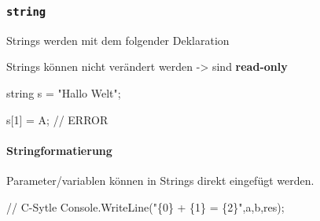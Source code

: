 \documentclass[
  9pt,
  a4paperpaper,
  DIV=11]{scrartcl}
\let\oldparagraph\paragraph
\renewcommand{\paragraph}[1]{\oldparagraph{#1}\mbox{}}
\newenvironment{Shaded}{}{}
\newcommand{\CharTok}[1]{\textcolor[rgb]{0.01,0.18,0.38}{#1}}
\newcommand{\CommentTok}[1]{\textcolor[rgb]{0.42,0.45,0.49}{#1}}
\newcommand{\DataTypeTok}[1]{\textcolor[rgb]{0.84,0.23,0.29}{#1}}
\newcommand{\DecValTok}[1]{\textcolor[rgb]{0.00,0.36,0.77}{#1}}
\newcommand{\FunctionTok}[1]{\textcolor[rgb]{0.44,0.26,0.76}{#1}}
\newcommand{\NormalTok}[1]{\textcolor[rgb]{0.14,0.16,0.18}{#1}}
\newcommand{\OperatorTok}[1]{\textcolor[rgb]{0.14,0.16,0.18}{#1}}
\newcommand{\StringTok}[1]{\textcolor[rgb]{0.01,0.18,0.38}{#1}}
\numberwithin{equation}{section}
\begin{document}
\begin{multicols}{2}
\begin{tcolorbox}
\end{tcolorbox}

\hypertarget{string}{%
\subsubsection{\texorpdfstring{\texttt{string}}{string}}\label{string}}

Strings werden mit dem folgender Deklaration

\begin{tcolorbox}[enhanced jigsaw, colbacktitle=quarto-callout-important-color!10!white, colback=white, rightrule=.15mm, title=\textcolor{quarto-callout-important-color}{\faExclamation}\hspace{0.5em}{Wichtig}, opacityback=0, arc=.35mm, coltitle=black, opacitybacktitle=0.6, breakable, bottomtitle=1mm, toptitle=1mm, colframe=quarto-callout-important-color-frame, bottomrule=.15mm, titlerule=0mm, left=2mm, leftrule=.75mm, toprule=.15mm]

Strings können nicht verändert werden -\textgreater{} sind
\textbf{read-only}

\begin{Shaded}
\begin{Highlighting}[]
\DataTypeTok{string}\NormalTok{ s }\OperatorTok{=} \StringTok{"Hallo Welt"}\OperatorTok{;}

\NormalTok{s}\OperatorTok{[}\DecValTok{1}\OperatorTok{]} \OperatorTok{=} \CharTok{\textquotesingle{}A\textquotesingle{}}\OperatorTok{;} \CommentTok{// ERROR}
\end{Highlighting}
\end{Shaded}

\end{tcolorbox}

\hypertarget{stringformatierung}{%
\paragraph{Stringformatierung}\label{stringformatierung}}

Parameter/variablen können in Strings direkt eingefügt werden.

\begin{Shaded}
\begin{Highlighting}[]
\CommentTok{// C{-}Sytle}
\NormalTok{Console}\OperatorTok{.}\FunctionTok{WriteLine}\OperatorTok{(}\StringTok{"\{0\} + \{1\} = \{2\}"}\OperatorTok{,}\NormalTok{a}\OperatorTok{,}\NormalTok{b}\OperatorTok{,}\NormalTok{res}\OperatorTok{);}


\end{Highlighting}
\end{Shaded}
\end{multicols}
\end{document}
